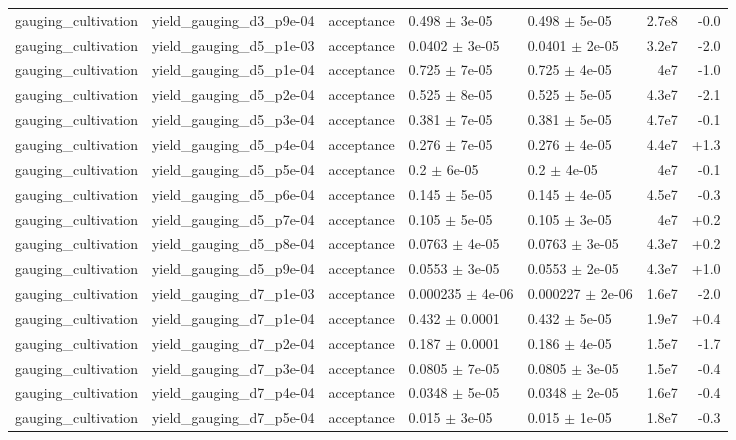 \documentclass[10pt]{article}
\begin{document}
{\begin{longtable}{l l l l l r r}
gauging\_cultivation & yield\_gauging\_d3\_p9e-04 & acceptance & 0.498 $\pm$ 3e-05 & 0.498 $\pm$ 5e-05 & 2.7e8 & -0.0 \\
gauging\_cultivation & yield\_gauging\_d5\_p1e-03 & acceptance & 0.0402 $\pm$ 3e-05 & 0.0401 $\pm$ 2e-05 & 3.2e7 & -2.0 \\
gauging\_cultivation & yield\_gauging\_d5\_p1e-04 & acceptance & 0.725 $\pm$ 7e-05 & 0.725 $\pm$ 4e-05 & 4e7 & -1.0 \\
gauging\_cultivation & yield\_gauging\_d5\_p2e-04 & acceptance & 0.525 $\pm$ 8e-05 & 0.525 $\pm$ 5e-05 & 4.3e7 & -2.1 \\
gauging\_cultivation & yield\_gauging\_d5\_p3e-04 & acceptance & 0.381 $\pm$ 7e-05 & 0.381 $\pm$ 5e-05 & 4.7e7 & -0.1 \\
gauging\_cultivation & yield\_gauging\_d5\_p4e-04 & acceptance & 0.276 $\pm$ 7e-05 & 0.276 $\pm$ 4e-05 & 4.4e7 & +1.3 \\
gauging\_cultivation & yield\_gauging\_d5\_p5e-04 & acceptance & 0.2 $\pm$ 6e-05 & 0.2 $\pm$ 4e-05 & 4e7 & -0.1 \\
gauging\_cultivation & yield\_gauging\_d5\_p6e-04 & acceptance & 0.145 $\pm$ 5e-05 & 0.145 $\pm$ 4e-05 & 4.5e7 & -0.3 \\
gauging\_cultivation & yield\_gauging\_d5\_p7e-04 & acceptance & 0.105 $\pm$ 5e-05 & 0.105 $\pm$ 3e-05 & 4e7 & +0.2 \\
gauging\_cultivation & yield\_gauging\_d5\_p8e-04 & acceptance & 0.0763 $\pm$ 4e-05 & 0.0763 $\pm$ 3e-05 & 4.3e7 & +0.2 \\
gauging\_cultivation & yield\_gauging\_d5\_p9e-04 & acceptance & 0.0553 $\pm$ 3e-05 & 0.0553 $\pm$ 2e-05 & 4.3e7 & +1.0 \\
gauging\_cultivation & yield\_gauging\_d7\_p1e-03 & acceptance & 0.000235 $\pm$ 4e-06 & 0.000227 $\pm$ 2e-06 & 1.6e7 & -2.0 \\
gauging\_cultivation & yield\_gauging\_d7\_p1e-04 & acceptance & 0.432 $\pm$ 0.0001 & 0.432 $\pm$ 5e-05 & 1.9e7 & +0.4 \\
gauging\_cultivation & yield\_gauging\_d7\_p2e-04 & acceptance & 0.187 $\pm$ 0.0001 & 0.186 $\pm$ 4e-05 & 1.5e7 & -1.7 \\
gauging\_cultivation & yield\_gauging\_d7\_p3e-04 & acceptance & 0.0805 $\pm$ 7e-05 & 0.0805 $\pm$ 3e-05 & 1.5e7 & -0.4 \\
gauging\_cultivation & yield\_gauging\_d7\_p4e-04 & acceptance & 0.0348 $\pm$ 5e-05 & 0.0348 $\pm$ 2e-05 & 1.6e7 & -0.4 \\
gauging\_cultivation & yield\_gauging\_d7\_p5e-04 & acceptance & 0.015 $\pm$ 3e-05 & 0.015 $\pm$ 1e-05 & 1.8e7 & -0.3 \\

\end{longtable}}
\end{document}
